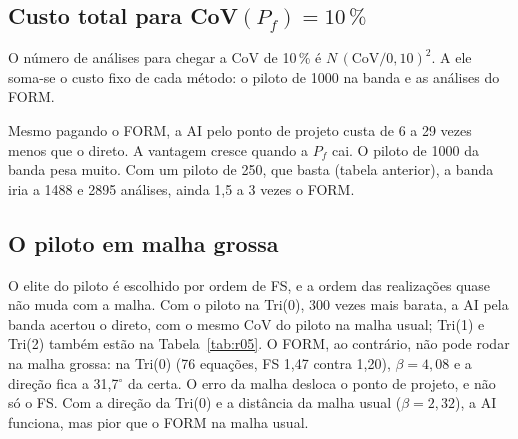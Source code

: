 \documentclass[11pt,a4paper]{article}
\begin{document}
\subsection{Custo total para CoV$(P_f) = 10\,\%$}
O número de análises para chegar a CoV de 10\,\% é $N\,(\mathrm{CoV}/0{,}10)^2$. A ele soma-se o custo fixo de cada método:
o piloto de 1000 na banda e as análises do FORM.
\begin{table}[H]\centering\small
{}
\caption{Análises de elementos finitos para CoV$(P_f) = 10\,\%$.}
\end{table}
Mesmo pagando o FORM, a AI pelo ponto de projeto custa de 6 a 29 vezes menos que o direto. A vantagem cresce quando a $P_f$ cai. O piloto de
1000 da banda pesa muito. Com um piloto de 250, que basta (tabela anterior), a banda iria a 1488 e 2895 análises, ainda 1,5 a 3 vezes o FORM.

\subsection{O piloto em malha grossa}
O elite do piloto é escolhido por ordem de FS, e a ordem das realizações quase não muda com a malha. Com o piloto na
Tri(0), 300 vezes mais barata, a AI pela banda acertou o direto, com o mesmo CoV do piloto na malha usual; Tri(1) e
Tri(2) também estão na Tabela~\ref{tab:r05}. O FORM, ao contrário, não pode rodar na malha grossa: na Tri(0) (76
equações, FS 1,47 contra 1,20), $\beta = 4{,}08$ e a direção fica a 31,7$^\circ$ da certa. O erro da malha desloca o
ponto de projeto, e não só o FS. Com a direção da Tri(0) e a distância da malha usual ($\beta = 2{,}32$), a AI funciona,
mas pior que o FORM na malha usual.
\end{document}
